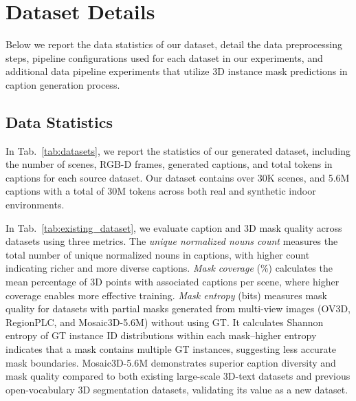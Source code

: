 \section{Dataset Details}
Below we report the data statistics of our \dataname dataset, detail the data preprocessing steps, pipeline configurations used for each dataset in our experiments, and additional data pipeline experiments that utilize 3D instance mask predictions in caption generation process.

\subsection{Data Statistics}
In Tab.~\ref{tab:datasets}, we report the statistics of our generated dataset, including the number of scenes, RGB-D frames, generated captions, and total tokens in captions for each source dataset. Our dataset contains over 30K scenes, and 5.6M captions with a total of 30M tokens across both real and synthetic indoor environments.


In Tab.~\ref{tab:existing_dataset}, we evaluate caption and 3D mask quality across datasets using three metrics. 
The \textit{unique normalized nouns count} measures the total number of unique normalized nouns in captions, with higher count indicating richer and more diverse captions.
\textit{Mask coverage} (\%) calculates the mean percentage of 3D points with associated captions per scene, where higher coverage enables more effective training.
\textit{Mask entropy} (bits) measures mask quality for datasets with partial masks generated from multi-view images (\ie OV3D, RegionPLC, and Mosaic3D-5.6M) without using GT.
It calculates Shannon entropy of GT instance ID distributions within each mask--higher entropy indicates that a mask contains multiple GT instances, suggesting less accurate mask boundaries.
Mosaic3D-5.6M demonstrates superior caption diversity and mask quality compared to both existing large-scale 3D-text datasets and previous open-vocabulary 3D segmentation datasets, validating its value as a new dataset.


